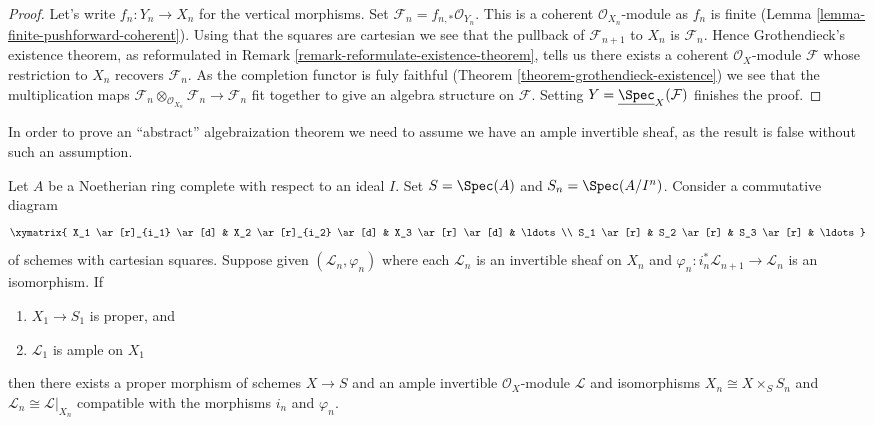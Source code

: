 \begin{proof}
Let's write $f_n : Y_n \to X_n$ for the vertical morphisms.
Set $\mathcal{F}_n = f_{n, *}\mathcal{O}_{Y_n}$. This is
a coherent $\mathcal{O}_{X_n}$-module as $f_n$ is finite
(Lemma \ref{lemma-finite-pushforward-coherent}).
Using that the squares are cartesian we see that
the pullback of $\mathcal{F}_{n + 1}$ to $X_n$ is $\mathcal{F}_n$.
Hence Grothendieck's existence theorem, as reformulated in
Remark \ref{remark-reformulate-existence-theorem},
tells us there exists a coherent $\mathcal{O}_X$-module
$\mathcal{F}$ whose restriction to $X_n$ recovers $\mathcal{F}_n$.
As the completion functor is fuly faithful
(Theorem \ref{theorem-grothendieck-existence})
we see that the multiplication maps
$\mathcal{F}_n \otimes_{\mathcal{O}_{X_n}} \mathcal{F}_n \to
\mathcal{F}_n$ fit together to give an algebra structure on $\mathcal{F}$.
Setting $Y = \underline{\Spec}_X(\mathcal{F})$ finishes the proof.
\end{proof}

\noindent
In order to prove an ``abstract'' algebraization theorem we need
to assume we have an ample invertible sheaf, as the result is false
without such an assumption.

\begin{theorem}
\label{theorem-algebraization}
Let $A$ be a Noetherian ring complete with respect to an ideal $I$.
Set $S = \Spec(A)$ and $S_n = \Spec(A/I^n)$. Consider a commutative
diagram
$$
\xymatrix{
X_1 \ar[r]_{i_1} \ar[d] & X_2 \ar[r]_{i_2} \ar[d] & X_3 \ar[r] \ar[d] &
\ldots \\
S_1 \ar[r] & S_2 \ar[r] & S_3 \ar[r] & \ldots
}
$$
of schemes with cartesian squares. Suppose given $(\mathcal{L}_n, \varphi_n)$
where each $\mathcal{L}_n$ is an invertible sheaf on $X_n$ and
$\varphi_n : i_n^*\mathcal{L}_{n + 1} \to \mathcal{L}_n$
is an isomorphism. If
\begin{enumerate}
\item $X_1 \to S_1$ is proper, and
\item $\mathcal{L}_1$ is ample on $X_1$
\end{enumerate}
then there exists a proper morphism of schemes $X \to S$
and an ample invertible $\mathcal{O}_X$-module $\mathcal{L}$
and isomorphisms $X_n \cong X \times_S S_n$ and
$\mathcal{L}_n \cong \mathcal{L}|_{X_n}$ compatible with
the morphisms $i_n$ and $\varphi_n$.
\end{theorem}

